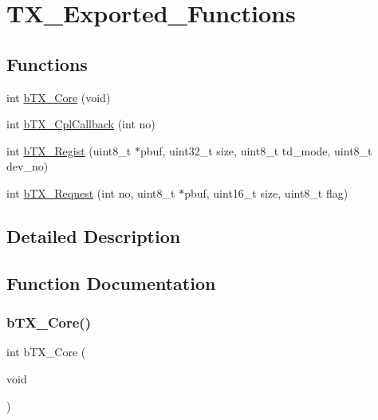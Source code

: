 \hypertarget{group___t_x___exported___functions}{}\section{T\+X\+\_\+\+Exported\+\_\+\+Functions}
\label{group___t_x___exported___functions}
\subsection*{Functions}
\begin{DoxyCompactItemize}
\item 
int \mbox{\hyperlink{group___t_x___exported___functions_gaf9afd0ae30f6af580ac18395a04d2fb8}{b\+T\+X\+\_\+\+Core}} (void)
\item 
int \mbox{\hyperlink{group___t_x___exported___functions_ga2559a6f7eb2673174d7ca0676f1cc192}{b\+T\+X\+\_\+\+Cpl\+Callback}} (int no)
\item 
int \mbox{\hyperlink{group___t_x___exported___functions_ga61ce9d9de75982f0d555892647510c8f}{b\+T\+X\+\_\+\+Regist}} (uint8\+\_\+t $\ast$pbuf, uint32\+\_\+t size, uint8\+\_\+t td\+\_\+mode, uint8\+\_\+t dev\+\_\+no)
\item 
int \mbox{\hyperlink{group___t_x___exported___functions_gad2ecf5eb42e98c674c128c616fd0f8c4}{b\+T\+X\+\_\+\+Request}} (int no, uint8\+\_\+t $\ast$pbuf, uint16\+\_\+t size, uint8\+\_\+t flag)
\end{DoxyCompactItemize}


\subsection{Detailed Description}


\subsection{Function Documentation}
\mbox{\label{group___t_x___exported___functions_gaf9afd0ae30f6af580ac18395a04d2fb8}} 
\subsubsection{\texorpdfstring{b\+T\+X\+\_\+\+Core()}{bTX\_Core()}}
{\footnotesize\ttfamily int b\+T\+X\+\_\+\+Core (\begin{DoxyParamCaption}\item[{void}]{ }\end{DoxyParamCaption})}

